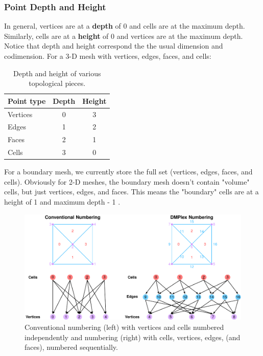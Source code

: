 \subsubsection{Point Depth and Height}

In general, vertices are at a {\bf depth} of 0 and cells are at the maximum depth. Similarly, cells are at a {\bf
height} of 0 and vertices are at the maximum depth. Notice that depth and height correspond the the usual dimension and
codimension. For a 3-D mesh with vertices, edges, faces, and cells:

\begin{table}
\begin{center}
\begin{tabular}{lcc}
\hline
Point type & Depth & Height \\
\hline
Vertices  &  0  &  3 \\
Edges  &  1  &  2 \\
Faces  &  2  &  1 \\
Cells  &  3  &  0 \\
\hline
\end{tabular}
\end{center}
\caption{Depth and height of various topological pieces.}
\end{table}

For a boundary mesh, we currently store the full set (vertices, edges, faces, and cells). Obviously for 2-D meshes, the
boundary mesh doesn't contain "volume" cells, but just vertices, edges, and faces. This means the "boundary" cells are
at a height of 1 and maximum depth - 1 .

\begin{figure}
  \includegraphics{developer/figs/meshtopology}
  \caption{Conventional numbering (left) with vertices and cells numbered independently and  numbering (right)
  with cells, vertices, edges, (and faces), numbered sequentially.}
  \label{fig:developer:mesh:topology}
\end{figure}

